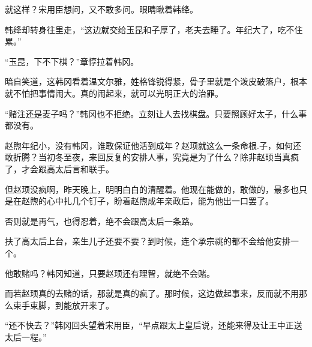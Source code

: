 就这样？宋用臣想问，又不敢多问。眼睛瞅着韩绛。

韩绛却转身往里走，“这边就交给玉昆和子厚了，老夫去睡了。年纪大了，吃不住累。”

“玉昆，下不下棋？”章惇拉着韩冈。

暗自笑道，这韩冈看着温文尔雅，姓格锋锐得紧，骨子里就是个泼皮破落户，根本就不怕把事情闹大。真的闹起来，就可以光明正大的治罪。

“赌注还是麦子吗？”韩冈也不拒绝。立刻让人去找棋盘。只要照顾好太子，什么事都没有。

赵煦年纪小，没有韩冈，谁敢保证他活到成年？赵顼就这么一条命根.子，如何还敢折腾？当初冬至夜，来回反复的安排人事，究竟是为了什么？除非赵顼当真疯了，才会跟高太后言和联手。

但赵顼没疯啊，昨天晚上，明明白白的清醒着。他现在能做的，敢做的，最多也只是在赵煦的心中扎几个钉子，盼着赵煦成年亲政后，能为他出一口罢了。

否则就是再气，也得忍着，绝不会跟高太后一条路。

扶了高太后上台，亲生儿子还要不要？到时候，连个承宗祧的都不会给他安排一个。

他敢赌吗？韩冈知道，只要赵顼还有理智，就绝不会赌。

而若赵顼真的去赌的话，那就是真的疯了。那时候，这边做起事来，反而就不用那么束手束脚，到能放开来了。

“还不快去？”韩冈回头望着宋用臣，“早点跟太上皇后说，还能来得及让王中正送太后一程。”


